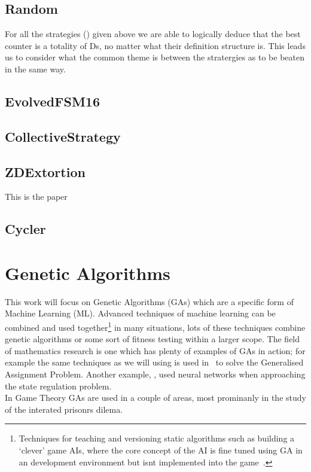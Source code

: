 \subsection{Random}\label{subsec:random}

For all the strategies () given above we are able to logically deduce that the best counter is a totality of Ds, no matter what their definition structure is.
This leads us to consider what the common theme is between the stratergies as to be beaten in the same way.



\subsection{EvolvedFSM16}\label{subsec:evolvedFSM16}
\subsection{CollectiveStrategy}\label{subsec:collectiveStrategy}
\subsection{ZDExtortion}\label{subsec:zdExtortion}
This is the paper~\cite{press2012iterated}
\subsection{Cycler}\label{subsec:cycler}

\section{Genetic Algorithms}
This work will focus on Genetic Algorithms (GAs) which are a specific form of Machine Learning (ML).
Advanced techniques of machine learning can be combined and used together\footnote{Techniques for teaching and versioning static algorithms such as building a `clever' game AIs, where the core concept of the AI is fine tuned using GA in an development environment but isnt implemented into the game~\cite{bakkes2009rapid}.} in many situations, lots of these techniques combine genetic algorithms or some sort of fitness testing within a larger scope.
The field of mathematics research is one which has plenty of examples of GAs in action;
for example the same techniques as we will using is used in~\cite{chu1997genetic} to solve the Generalised Assignment Problem.
Another example, \cite{bhanu1995adaptive}, used neural networks when approaching the state regulation problem. \\

In Game Theory GAs are used in a couple of areas, most prominanly in the study of the interated prisonrs dilema.